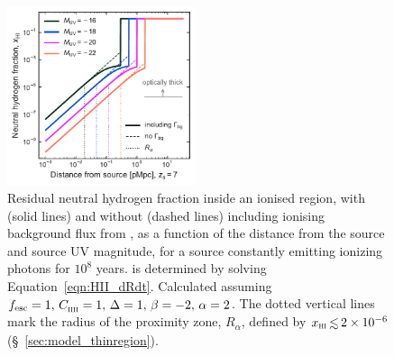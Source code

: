 \documentclass[fleqn,usenatbib]{mnras}
\begin{document}
\begin{figure}
    \includegraphics[width=0.49\textwidth]{figs/fig2.pdf}
    \caption{Residual neutral hydrogen fraction inside an ionised region, with (solid lines) and without (dashed lines) including ionising background flux from \citet{Khaire2019}, as a function of the distance from the source and source UV magnitude, for a source constantly emitting ionizing photons for $10^8$ years. \Rion is determined by solving Equation~\eqref{eqn:HII_dRdt}. Calculated assuming $\fesc=1, \, \clump=1, \, \Delta=1, \, \beta=-2, \, \alpha = 2$. The dotted vertical lines mark the radius of the proximity zone, $R_\alpha$, defined by $\xHI \simlt 2\times10^{-6}$ (\S~\ref{sec:model_thinregion}).}
    \label{fig:x_HII_r}
\end{figure}
\end{document}
